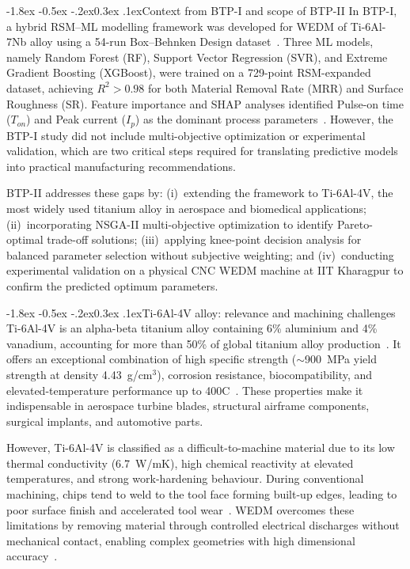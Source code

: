 \documentclass[12pt, a4paper]{report}
\makeatletter
\renewcommand{\section}{\@startsection{section}{1}{\z@}%
  {-1.8ex \@plus -0.5ex \@minus -.2ex}{0.3ex \@plus.1ex}{\normalfont\bfseries}}
\makeatother
\begin{document}
\section{Context from BTP-I and scope of BTP-II}
In BTP-I, a hybrid RSM--ML modelling framework was developed for WEDM of Ti-6Al-7Nb alloy using a 54-run Box--Behnken Design dataset~\cite{Reddy2022}. Three ML models, namely Random Forest (RF), Support Vector Regression (SVR), and Extreme Gradient Boosting (XGBoost), were trained on a 729-point RSM-expanded dataset, achieving $R^2 > 0.98$ for both Material Removal Rate (MRR) and Surface Roughness (SR). Feature importance and SHAP analyses identified Pulse-on time ($T_{on}$) and Peak current ($I_p$) as the dominant process parameters~\cite{Saha2021}. However, the BTP-I study did not include multi-objective optimization or experimental validation, which are two critical steps required for translating predictive models into practical manufacturing recommendations.

BTP-II addresses these gaps by: (i)~extending the framework to Ti-6Al-4V, the most widely used titanium alloy in aerospace and biomedical applications; (ii)~incorporating NSGA-II multi-objective optimization to identify Pareto-optimal trade-off solutions; (iii)~applying knee-point decision analysis for balanced parameter selection without subjective weighting; and (iv)~conducting experimental validation on a physical CNC WEDM machine at IIT Kharagpur to confirm the predicted optimum parameters.

\section{Ti-6Al-4V alloy: relevance and machining challenges}
Ti-6Al-4V is an alpha-beta titanium alloy containing 6\% aluminium and 4\% vanadium, accounting for more than 50\% of global titanium alloy production~\cite{Prasad2014}. It offers an exceptional combination of high specific strength ($\sim$900~MPa yield strength at density 4.43~g/cm$^3$), corrosion resistance, biocompatibility, and elevated-temperature performance up to 400\textdegree C~\cite{Devarasiddappa2018}. These properties make it indispensable in aerospace turbine blades, structural airframe components, surgical implants, and automotive parts.

However, Ti-6Al-4V is classified as a difficult-to-machine material due to its low thermal conductivity (6.7~W/mK), high chemical reactivity at elevated temperatures, and strong work-hardening behaviour. During conventional machining, chips tend to weld to the tool face forming built-up edges, leading to poor surface finish and accelerated tool wear~\cite{Devarasiddappa2020, Jagdale2025}. WEDM overcomes these limitations by removing material through controlled electrical discharges without mechanical contact, enabling complex geometries with high dimensional accuracy~\cite{Gupta2021, AltinKaratas2023}.
\end{document}
